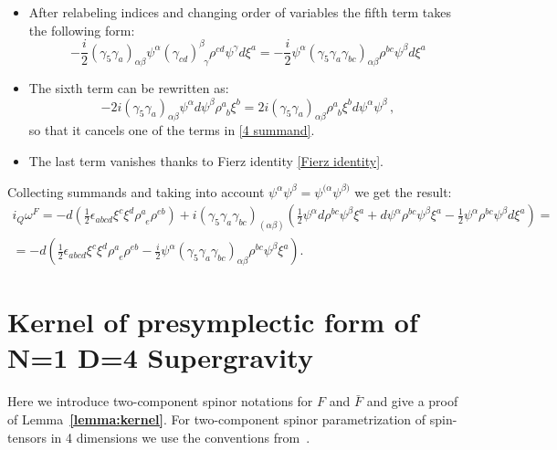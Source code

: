 \documentclass[a4paper,12pt]{article}
\numberwithin{equation}{section} %
\newcommand{\bref}[1]{\textbf{\ref{#1}}}
\numberwithin{equation}{section}
\begin{document}
\begin{appendix}
\begin{itemize}
\begin{equation}
        \end{equation}
        \item After relabeling indices and changing order of variables the fifth term takes the following form:
        \begin{equation}
            -\frac{i}{2}(\gamma_5\gamma_a)_{\alpha\beta} \psi^\alpha (\gamma_{cd})^\beta_{\enspace\gamma} \rho^{cd} \psi^\gamma d\xi^a = -\frac{i}{2}\psi^\alpha(\gamma_5\gamma_a\gamma_{bc})_{\alpha\beta} \rho^{bc}\psi^\beta d\xi^a
        \end{equation}
        \item  The sixth term can be rewritten as:
        \begin{equation}
            -2i(\gamma_5 \gamma_a)_{\alpha \beta} \psi^\alpha d\psi^\beta \rho^a_{\enspace b} \xi^b = 2i(\gamma_5\gamma_a)_{\alpha\beta} \rho^a_{\enspace b}\xi^b d\psi^\alpha \psi^\beta\,,
        \end{equation}
        so that it cancels one of the terms in \eqref{4 summand}.
        \item The last term vanishes thanks to Fierz identity \eqref{Fierz identity}.
    \end{itemize}
    
    Collecting summands and taking into account $\psi^\alpha \psi^\beta = \psi^{(\alpha} \psi^{\beta)}$ we get the result:
    \begin{equation}
        \begin{gathered}
        i_Q \omega^F = -d\left(\frac{1}{2}\epsilon_{abcd}\xi^c \xi^d \rho^a_{\enspace e} \rho^{eb}\right) + i(\gamma_5 \gamma_a \gamma_{bc})_{(\alpha\beta)} \left(\frac{1}{2}  \psi^\alpha d\rho^{bc}  \psi^\beta \xi^a +d\psi^\alpha  \rho^{bc}  \psi^\beta \xi^a- \frac{1}{2}\psi^\alpha \rho^{bc}  \psi^\beta d\xi^a\right) = \\
        =- d \left(\frac{1}{2}\epsilon_{abcd}\xi^c \xi^d \rho^a_{\enspace e} \rho^{eb} - \frac{i}{2} \psi^\alpha (\gamma_5 \gamma_a \gamma_{bc})_{\alpha\beta} \rho^{bc} \psi^\beta \xi^a\right).
        \end{gathered}
    \end{equation}


\section{Kernel of presymplectic form of N=1 D=4 Supergravity}\label{app:kernel of presympelctic form}
Here we introduce two-component spinor notations for $F$ and $\bar F$ and give a proof of Lemma~\bref{lemma:kernel}. For two-component spinor parametrization of spin-tensors in 4 dimensions we use the conventions from~\cite{huggett1994introduction}.


\end{appendix}
\end{document}
